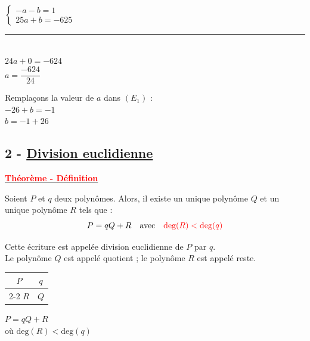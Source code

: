 \documentclass[12pt,a4paper]{article}
\begin{document}
\vspace{0.5em}

\noindent $\begin{cases} -a - b = 1 \\ 25a + b = -625 \end{cases}$ \\
\rule{2.5cm}{0.4pt} \\
$24a + 0 = -624$ \\
$a = \dfrac{-624}{24}$ \\

\vspace{1em}

\noindent Remplaçons la valeur de $a$ dans $(E_1)$ : \\
$-26 + b = -1$ \\
$b = -1 + 26$ \\

\vspace{1.5em}

\subsection*{%
    \color{red}2 - \underline{ Division euclidienne}%
}

\textbf{\underline{\textcolor{red}{Théorème - Définition}}}
  
\noindent Soient $P$ et $q$ deux polynômes. Alors, il existe un unique polynôme $Q$ et un unique polynôme $R$ tels que :
$$P = qQ + R \quad \text{avec} \quad {\color{red} \text{deg}(R) < \text{deg}(q)}$$

\noindent Cette écriture est appelée {\color{red} division euclidienne} de $P$ par $q$. \\
Le polynôme $Q$ est appelé {\color{red} quotient} ; le polynôme $R$ est appelé {\color{red} reste}.

\vspace{1.5em}

\begin{minipage}[t]{0.3\textwidth}
    \begin{tabular}{c|c}
        $P$ & $q$ \\
        \cline{2-2}
        $R$ & $Q$
    \end{tabular}
\end{minipage}
\begin{minipage}[t]{0.6\textwidth}
    $P = qQ + R$ \\
    où $\text{deg}(R) < \text{deg}(q)$
\end{minipage}
\end{document}
